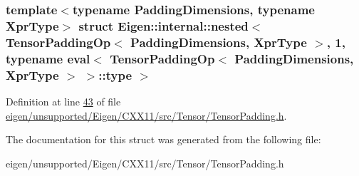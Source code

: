 \subsubsection*{template$<$typename Padding\+Dimensions, typename Xpr\+Type$>$\newline
struct Eigen\+::internal\+::nested$<$ Tensor\+Padding\+Op$<$ Padding\+Dimensions, Xpr\+Type $>$, 1, typename eval$<$ Tensor\+Padding\+Op$<$ Padding\+Dimensions, Xpr\+Type $>$ $>$\+::type $>$}



Definition at line \hyperlink{eigen_2unsupported_2_eigen_2_c_x_x11_2src_2_tensor_2_tensor_padding_8h_source_l00043}{43} of file \hyperlink{eigen_2unsupported_2_eigen_2_c_x_x11_2src_2_tensor_2_tensor_padding_8h_source}{eigen/unsupported/\+Eigen/\+C\+X\+X11/src/\+Tensor/\+Tensor\+Padding.\+h}.



The documentation for this struct was generated from the following file\+:\begin{DoxyCompactItemize}
\item 
eigen/unsupported/\+Eigen/\+C\+X\+X11/src/\+Tensor/\+Tensor\+Padding.\+h\end{DoxyCompactItemize}
